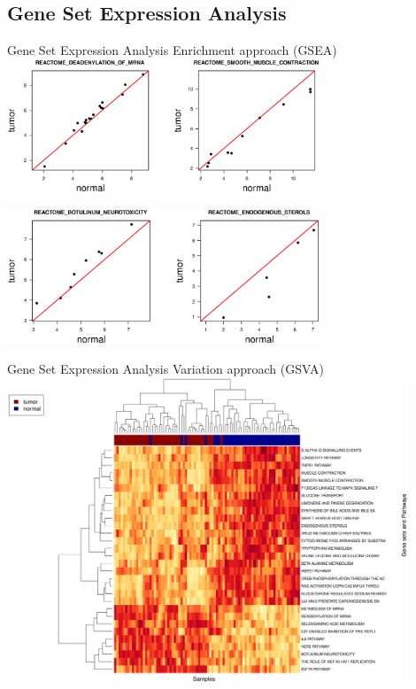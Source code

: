 \documentclass{beamer}
\begin{document}
\subsection{Gene Set Expression Analysis}

\begin{frame}{Gene Set Expression Analysis}{ Enrichment approach (GSEA)}
  \centering 
    \includegraphics[width=0.7\textwidth,height=0.5\textheight,keepaspectratio]{genesets1.eps} 
    
    \centering
    \includegraphics[width=0.7\textwidth,height=0.5\textheight,keepaspectratio]{genesets2.eps}

\end{frame}

\begin{frame}{Gene Set Expression Analysis}{ Variation  approach (GSVA)}
        \includegraphics[width=0.9\textwidth,height=0.8\textheight,keepaspectratio]{ClusteringGSVA.eps}

\end{frame}
\end{document}
